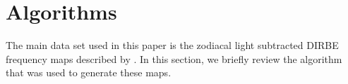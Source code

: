 \documentclass{aa}
\begin{document}
%   
%   
%   
%   
%   
%   
%   

\section{Algorithms}
\label{sec:algorithm}

The main data set used in this paper is the zodiacal light subtracted
DIRBE frequency maps described by \citet{CG02_01}. In this section, we
briefly review the algorithm that was used to generate these maps.

\end{document}
